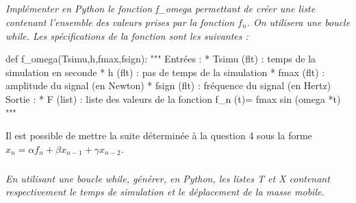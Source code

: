 \documentclass[10pt]{article}
\newif\ifprof
\begin{document}
\fi
\subparagraph{}
\textit{Implémenter en Python le fonction \textsf{f\_omega} permettant de créer une liste contenant l'ensemble des valeurs prises par la fonction $f_n$. On utilisera une boucle \textsf{while}. Les spécifications de la fonction sont les suivantes : }
\ifprof
\else


\begin{py}
\begin{python}
def f_omega(Tsimu,h,fmax,fsign):
   """
   Entrées :
       * Tsimu (flt) : temps de la simulation en seconde
       * h (flt) : pas de temps de la simulation
       * fmax (flt) : amplitude du signal (en Newton)
       * fsign (flt) : fréquence du signal (en Hertz)
   Sortie : 
       * F (list) : liste des valeurs de la fonction 
          f_n (t)= fmax sin (omega *t)
   """
\end{python}
\end{py}

\fi

\ifprof
\begin{corrige}
\begin{py}
\begin{python}
def f_omega(Tsimu,h,fmax,fsign):
   """
   Entrées :
       * Tsimu (flt) : temps de la simulation en seconde
       * h (flt) : pas de temps de a simulation
       * fmax (flt) : amplitude du signal (en Newton)
       * fsign (flt) : fréquence du signal (en Hertz)
   Sortie : 
       * F (list) : liste des valeurs de la fonction 
          f_n (t)= fmax sin (omega *t)
   """
    omega  = 2*math.pi*fsign
    t=0 
    F = []
    while t<Tsimu :
        F.append(fmax*math.sin(omega*t))
        t=t+h
    return F
    
\end{python}
\end{py}

\end{corrige}
\else
\fi

\ifprof
\else

Il est possible de mettre la suite déterminée à la question 4 sous la forme $x_n = \alpha f_n +\beta x_{n-1} + \gamma x_{n-2}$.

\fi

\subparagraph{}
\textit{En utilisant une boucle \textsf{while}, générer, en Python, les listes \textsf{T} et \textsf{X} contenant respectivement le temps de simulation et le déplacement de la masse mobile.}
\ifprof
\begin{corrige}
\begin{python}

T=[0,h]
X=[0,0]
t=2*h
i=2
while t<Tsimu:
    T.append(t)
    X.append(alpha*F[i]+beta*X[i-1] +gamma*X(i-2))
    i=i+1
    t = t+h
\end{python}
\end{corrige}
\else
\fi


\else
\fi
\end{document}
